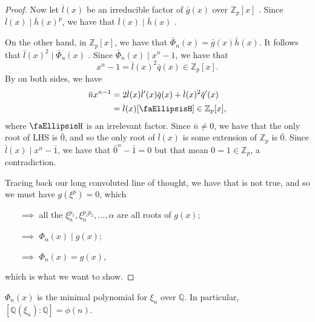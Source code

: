 \documentclass[notoc,notitlepage]{tufte-book}
\begin{document}
\begin{proof}
  Now let $\bar{l}(x)$ be an irreducible factor of $\bar{g}(x)$ over $\mathbb{Z}_p[x]$
  . Since $\bar{l}(x) \mid \bar{h}(x)^p$, we
  have that $\bar{l}(x) \mid \bar{h}(x)$ . %

  On the other hand, in $\mathbb{Z}_p[x]$, we have that $\bar{\Phi}_n(x) = \bar{g}(x)
  \bar{h}(x)$. It follows that $\bar{l}(x)^2 \mid \bar{\Phi}_n(x)$
  . %
  Since $\bar{\Phi}_n(x) \mid x^n - 1$, we have that
  \begin{equation*}
    x^n - 1 = \bar{l}(x)^2 \bar{q}(x) \in \mathbb{Z}_p[x].
  \end{equation*}
  By  on both sides, we have
  \begin{align*}
    \bar{n} x^{n - 1} &= 2 \bar{l}(x) \bar{l}'(x) \bar{q}(x) + \bar{l}(x)^2 \bar{q}'(x) \\
                      &= \bar{l}(x) [ \faEllipsisH ] \in \mathbb{Z}_p[x],
  \end{align*}
  where $\faEllipsisH$ is an irrelevant factor. Since $\bar{n} \neq 0$, we have that the
  only root of LHS is $\bar{0}$, and so the only root of $\bar{l}(x)$ is some extension of
  $\mathbb{Z}_p$ is $\bar{0}$. Since $\bar{l}(x) \mid x^n - \bar{1}$, we have that
  $\bar{0}^n - \bar{1} = 0$ but that mean $0 = 1 \in \mathbb{Z}_p$, a contradiction.

  Tracing back our long convoluted line of thought, we have that \faDizzy is not true, and
  so we must have $g(\xi^p) = 0$, which
  \begin{itemize}
    \item[$\implies$] all the $\xi_n^{p_1}, \xi_n^{p_1 p_2}, \ldots, \alpha$ are all roots
      of $g(x)$;
    \item[$\implies$] $\Phi_n(x) \mid g(x)$;
    \item[$\implies$] $\Phi_n(x) = g(x)$,
  \end{itemize}
  which is what we want to show.
\end{proof}

\begin{crly}\label{crly:cyclotomic_polynomials_are_minimal_polynomials_of_its_roots_over_q_}
  $\Phi_n(x)$ is the minimal polynomial for $\xi_n$ over $\mathbb{Q}$. In particular, $[
  \mathbb{Q}(\xi_n) : \mathbb{Q} ] = \phi(n)$.
\end{crly}
\end{document}
